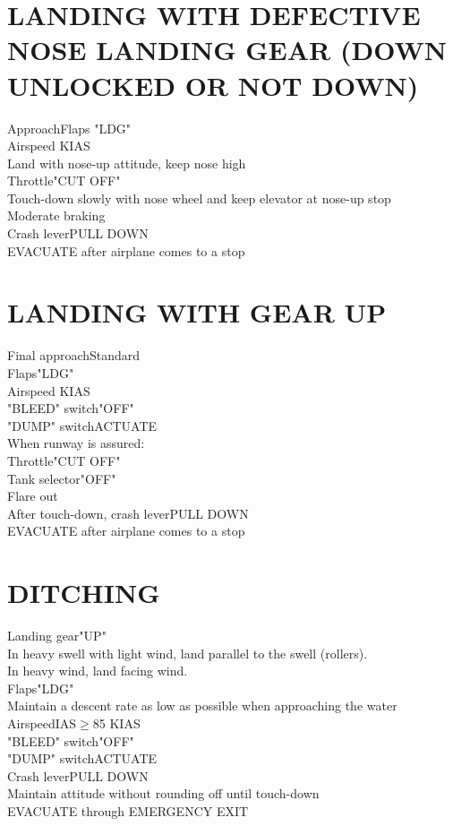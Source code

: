 \documentclass{article}
\begin{document}
\begin{multicols*}{2}
\section*{LANDING WITH DEFECTIVE NOSE LANDING GEAR (DOWN UNLOCKED OR NOT DOWN)}
Approach\dotfill Flaps "LDG"\\
Airspeed KIAS\\
Land with nose-up attitude, keep nose high\\
Throttle\dotfill "CUT OFF"\\
Touch-down slowly with nose wheel and keep elevator at nose-up stop\\
Moderate braking\\
Crash lever\dotfill PULL DOWN\\
EVACUATE after airplane comes to a stop
\section*{LANDING WITH GEAR UP}
Final approach\dotfill Standard\\
Flaps\dotfill "LDG"\\
Airspeed KIAS\\
"BLEED" switch\dotfill "OFF"\\
"DUMP" switch\dotfill ACTUATE\\
When runway is assured:\\
Throttle\dotfill "CUT OFF"\\
Tank selector\dotfill "OFF"\\
Flare out\\
After touch-down, crash lever\dotfill PULL DOWN\\
EVACUATE after airplane comes to a stop
\vfill\null
\section*{DITCHING}
Landing gear\dotfill "UP"\\
In heavy swell with light wind, land parallel to the swell (rollers).\\
In heavy wind, land facing wind.\\
Flaps\dotfill "LDG"\\
Maintain a descent rate as low as possible when approaching the water\\
Airspeed\dotfill IAS$\geq$85 KIAS\\
"BLEED" switch\dotfill "OFF"\\
"DUMP" switch\dotfill ACTUATE\\
Crash lever\dotfill PULL DOWN\\
Maintain attitude without rounding off until touch-down\\
EVACUATE through EMERGENCY EXIT

\end{multicols*}
\end{document}
